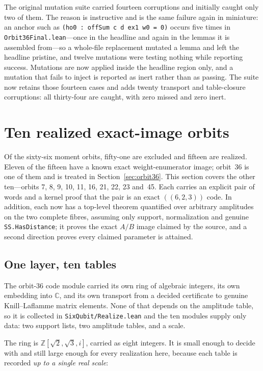 \documentclass[11pt,a4paper]{article}
\newcommand{\CC}{\mathbb{C}}
\newcommand{\lean}[1]{\texttt{#1}}
\theoremstyle{definition}
\begin{document}
The original mutation suite carried fourteen corruptions and initially caught
only two of them. The reason is instructive and is the same failure again in miniature:
an anchor such as \lean{(ho0 : offSum c d ex1 w0 = 0)} occurs five times in
\lean{Orbit36Final.lean}---once in the headline and again in the lemmas it is
assembled from---so a whole-file replacement mutated a lemma and left the
headline pristine, and twelve mutations were testing nothing while reporting
success. Mutations are now applied inside the headline region only, and a
mutation that fails to inject is reported as inert rather than as passing.  The
suite now retains those fourteen cases and adds twenty transport and table-closure
corruptions: all thirty-four are caught, with zero missed and zero inert.

\section{Ten realized exact-image orbits}
\label{sec:realizations}

Of the sixty-six moment orbits, fifty-one are excluded and fifteen are
realized. Eleven of the fifteen have a known exact weight-enumerator image;
orbit~36 is one of them and is treated in Section~\ref{sec:orbit36}. This
section covers the other ten---orbits 7, 8, 9, 10, 11, 16, 21, 22, 23
and~45. Each carries an explicit pair of words and a kernel proof that the pair
is an exact $((6,2,3))$ code. In addition, each now has a top-level theorem
quantified over arbitrary amplitudes on the two complete fibres, assuming only
support, normalization and genuine \lean{SS.HasDistance}; it proves the exact
$A/B$ image claimed by the source, and a second direction proves every claimed
parameter is attained.

\subsection{One layer, ten tables}

The orbit-36 code module carried its own ring of algebraic integers, its own
embedding into $\CC$, and its own transport from a decided certificate to
genuine Knill--Laflamme matrix elements. None of that depends on the amplitude
table, so it is collected in \lean{SixQubit/Realize.lean} and the ten modules
supply only data: two support lists, two amplitude tables, and a scale.

The ring is $\mathbb{Z}[\sqrt2,\sqrt3,i]$, carried as eight integers. It is
small enough to decide with and still large enough for every realization here,
because each table is recorded \emph{up to a single real scale}:
\end{document}
